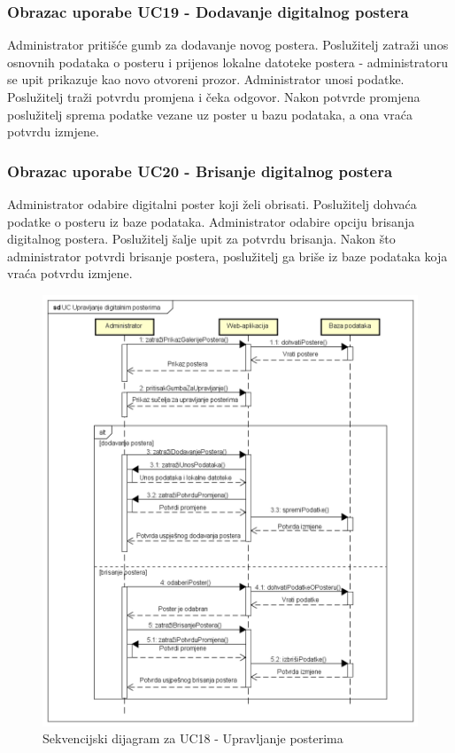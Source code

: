 				\subsubsection{Obrazac uporabe UC19 - Dodavanje digitalnog postera}
				Administrator pritišće gumb za dodavanje novog postera. Poslužitelj zatraži unos osnovnih podataka o posteru i  prijenos lokalne datoteke postera - administratoru se upit prikazuje kao novo otvoreni prozor. Administrator unosi podatke. Poslužitelj traži potvrdu promjena i čeka odgovor. Nakon potvrde promjena poslužitelj sprema podatke vezane uz poster u bazu podataka, a ona vraća potvrdu izmjene.
				
				\subsubsection{Obrazac uporabe UC20 - Brisanje digitalnog postera}
				Administrator odabire digitalni poster koji želi obrisati. Poslužitelj dohvaća podatke o posteru iz baze podataka. Administrator odabire opciju brisanja digitalnog postera. Poslužitelj šalje upit za potvrdu brisanja. Nakon što administrator potvrdi brisanje postera, poslužitelj ga briše iz baze podataka koja vraća potvrdu izmjene.
				
				\newpage
				
				\begin{figure}[hp!]
					\includegraphics[width=\linewidth]{Slike/SD_UpravljanjePosterima.png}
					\caption{Sekvencijski dijagram za UC18 - Upravljanje posterima}
				\end{figure}
				
